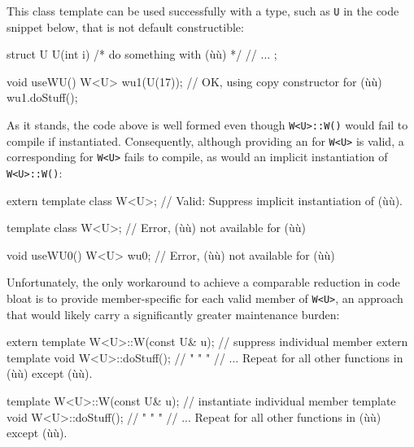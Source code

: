 \noindent This class template can be used successfully with a type, such as
\lstinline!U! in the code snippet below, that is not default constructible:

\begin{emcppslisting}[emcppsbatch=e8]
struct U
{
    U(int i) { /* do something with (ù{}ù) */ }
    // ...
};

void useWU()
{
    W<U> wu1(U(17));  // OK, using copy constructor for (ù{}ù)
    wu1.doStuff();
}
\end{emcppslisting}

\noindent As it stands, the code above is well formed even though
\lstinline!W<U>::W()! would fail to compile if instantiated. Consequently,
although providing an 
for \lstinline!W<U>! is valid, a corresponding
 for \lstinline!W<U>!
fails to compile, as would an implicit instantiation of
\lstinline!W<U>::W()!:

\begin{emcppslisting}[emcppsbatch=e8]
extern template class W<U>;  // Valid: Suppress implicit instantiation of (ù{}ù).

template class W<U>;         // Error, (ù{}ù) not available for (ù{}ù)

void useWU0()
{
    W<U> wu0{};       // Error, (ù{}ù) not available for (ù{}ù)
}
\end{emcppslisting}

\noindent Unfortunately, the only workaround to achieve a comparable reduction in
code bloat is to provide member-specific  for each valid member of \lstinline!W<U>!, an approach
that would likely carry a significantly greater maintenance burden:

\begin{emcppslisting}[emcppsbatch=e8]
extern template W<U>::W(const U& u);   // suppress individual member
extern template void W<U>::doStuff();  //    "         "        "
// ... Repeat for all other functions in (ù{}ù) except (ù{}ù).

template W<U>::W(const U& u);          // instantiate individual member
template void W<U>::doStuff();         //       "         "        "
// ... Repeat for all other functions in (ù{}ù) except (ù{}ù).
\end{emcppslisting}

